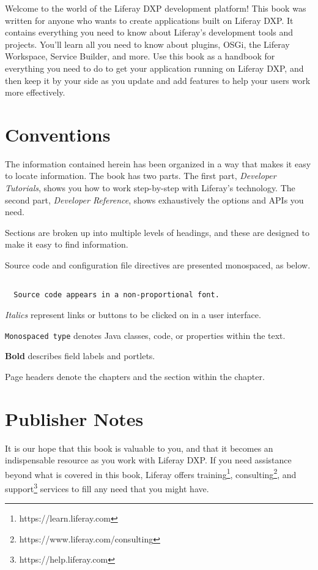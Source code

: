 \documentclass[11pt,openright,twoside]{memoir}
\begin{document}
Welcome to the world of the Liferay DXP development platform! This book was written for anyone who wants to create applications built on Liferay DXP. It contains everything you need to know about Liferay's development tools and projects. You'll learn all you need to know about plugins, OSGi, the Liferay Workspace, Service Builder, and more. Use this book as a handbook for everything you need to do to get your application running on Liferay DXP, and then keep it by your side as you update and add features to help your users work more effectively.

\section{Conventions}

The information contained herein has been organized in a way that makes it easy to locate information. The book has two parts. The first part, \textit{Developer Tutorials}, shows you how to work step-by-step with Liferay's technology. The second part, \textit{Developer Reference}, shows exhaustively the options and APIs you need. 

Sections are broken up into multiple levels of headings, and these are designed to make it easy to find information.

Source code and configuration file directives are presented monospaced, as below.

\begin{verbatim}

  Source code appears in a non-proportional font. 

\end{verbatim}

\textit{Italics} represent links or buttons to be clicked on in a user interface.

\texttt{Monospaced type} denotes Java classes, code, or properties within the text.

\textbf{Bold} describes field labels and portlets.

Page headers denote the chapters and the section within the chapter.

\section{Publisher Notes}

It is our hope that this book is valuable to you, and that it becomes an indispensable resource as you work with Liferay DXP. If you need assistance beyond what is covered in this book, Liferay offers training\footnote{https://learn.liferay.com}, consulting\footnote{https://www.liferay.com/consulting}, and support\footnote{https://help.liferay.com} services to fill any need that you might have. 
\end{document}
